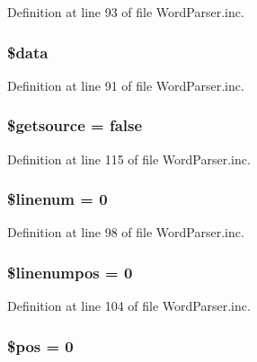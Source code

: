 \-Definition at line 93 of file \-Word\-Parser.\-inc.

\hypertarget{class_word_parser_a6efc15b5a2314dd4b5aaa556a375c6d6}{
\subsubsection[{\$data}]{\setlength{\rightskip}{0pt plus 5cm}\$data}}\label{class_word_parser_a6efc15b5a2314dd4b5aaa556a375c6d6}


\-Definition at line 91 of file \-Word\-Parser.\-inc.

\hypertarget{class_word_parser_a7cdafe29d7c2ccaaa1c2881f438f54e2}{
\subsubsection[{\$getsource}]{\setlength{\rightskip}{0pt plus 5cm}\$getsource = false}}\label{class_word_parser_a7cdafe29d7c2ccaaa1c2881f438f54e2}


\-Definition at line 115 of file \-Word\-Parser.\-inc.

\hypertarget{class_word_parser_a597bef7e50a56c650cf17a1ed6bc5595}{
\subsubsection[{\$linenum}]{\setlength{\rightskip}{0pt plus 5cm}\$linenum = 0}}\label{class_word_parser_a597bef7e50a56c650cf17a1ed6bc5595}


\-Definition at line 98 of file \-Word\-Parser.\-inc.

\hypertarget{class_word_parser_a2aa4e37c6ca61c3ace74dc74c08cbef0}{
\subsubsection[{\$linenumpos}]{\setlength{\rightskip}{0pt plus 5cm}\$linenumpos = 0}}\label{class_word_parser_a2aa4e37c6ca61c3ace74dc74c08cbef0}


\-Definition at line 104 of file \-Word\-Parser.\-inc.

\hypertarget{class_word_parser_a5de51f0c80b3bb3b39a57b23f6b9ea9f}{
\subsubsection[{\$pos}]{\setlength{\rightskip}{0pt plus 5cm}\$pos = 0}}\label{class_word_parser_a5de51f0c80b3bb3b39a57b23f6b9ea9f}


